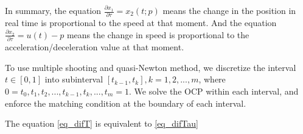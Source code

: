In summary, the equation $\frac{\partial x_1}{\partial \tau}= x_2(t;p) $ means the change in the position in real time is proportional to the speed at that moment. And the equation $\frac{\partial x_2}{\partial \tau} = u(t)-p $ means the change in speed is proportional to the acceleration/deceleration value at that moment. 

To use multiple shooting and quasi-Newton method, we discretize the interval $t\in [0,1]$ into subinterval $[t_{k-1}, t_k], k = 1, 2, ..., m$, where $0 =t_0, t_1, t_2, ...,t_{k-1}, t_k, ..., t_m=1$. We solve the OCP within each interval, and enforce the matching condition at the boundary of each interval. 

The equation \ref{eq_difT} is equivalent to \ref{eq_difTau}









 
